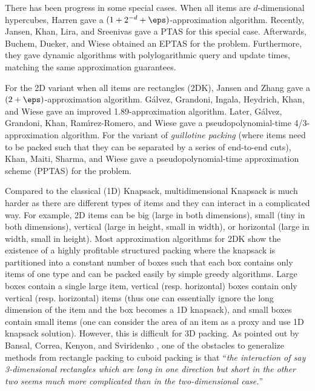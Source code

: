 There has been progress in some special cases.
When all items are $d$-dimensional hypercubes, Harren \cite{harren-journal} gave a $(1+2^{-d}+\eps)$-approximation algorithm. 
Recently, Jansen, Khan, Lira, and Sreenivas \cite{Jansencubepacking22} gave a PTAS for this special case. 
Afterwards, Buchem, Dueker, and Wiese \cite{BuchemDW24}  obtained an EPTAS for the problem. 
Furthermore, they gave dynamic algorithms with polylogarithmic query and update times, matching the same approximation guarantees. 


For the 2D variant when all items are rectangles (2DK), Jansen and Zhang \cite{jansen-zhang} gave a $(2+\eps)$-approximation algorithm. 
G{\'{a}}lvez, Grandoni, Ingala, Heydrich, Khan, and Wiese \cite{2dks-Lpacking} 
gave an improved 1.89-approximation algorithm. Later, G{\'{a}}lvez, Grandoni, Khan, Ram{\'{\i}}rez{-}Romero, and Wiese \cite{Galvez00RW21} gave a pseudopolynomial-time 4/3-approximation algorithm. 
For the variant of {\em guillotine packing} (where items need to be packed such that they can be separated by a series of end-to-end cuts), Khan, Maiti, Sharma, and Wiese \cite{KMSW21} gave a pseudopolynomial-time approximation scheme (PPTAS) for the problem. 
 

Compared to the classical (1D) Knapsack, multidimensional Knapsack is much harder as there are different types of items and they can interact in a complicated way. 
For example, 2D items can be big (large in both dimensions), small (tiny in both dimensions), vertical (large in height, small in width), or horizontal (large in width, small in height).
Most approximation algorithms for 2DK show the existence of a highly profitable structured packing where the knapsack is partitioned into a constant number of boxes such that each box contains only items of one type and can be packed easily by simple greedy algorithms. 
Large boxes contain a single large item, vertical (resp. horizontal) boxes contain only vertical (resp. horizontal) items (thus one can essentially ignore the long dimension of the item and the box becomes a 1D knapsack), and small boxes contain small items (one can consider the area of an item as a proxy and use 1D knapsack solution). 
However, this is difficult for 3D packing.  
As pointed out by Bansal, Correa, Kenyon, and Sviridenko \cite{bansal2006bin}, one of the obstacles to generalize methods from rectangle packing to cuboid packing is that ``{\em the interaction of say 3-dimensional rectangles which are long in one direction but short in the other two seems much more complicated than in the two-dimensional case.}'' 

